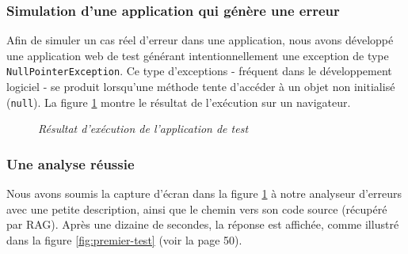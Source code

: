 \documentclass[12pt,a4paper]{report}
\begin{document}
	
	\subsubsection{Simulation d'une application qui génère une erreur}
	
	Afin de simuler un cas réel d'erreur dans une application, nous avons développé une application web de test générant intentionnellement une exception de type \verb|NullPointerException|. Ce type d'exceptions - fréquent dans le développement logiciel - se produit lorsqu'une méthode tente d'accéder à un objet non initialisé (\verb|null|). La figure \ref{fig:simulation-erreur} montre le résultat de l'exécution sur un navigateur.
	
	\begin{figure}[H]
		\centering
		\caption{\textit{Résultat d'exécution de l'application de test}}
		\label{fig:simulation-erreur}
	\end{figure}
	
	\subsubsection{Une analyse réussie}
	
	Nous avons soumis la capture d'écran dans la figure \ref{fig:simulation-erreur} à notre analyseur d'erreurs avec une petite description, ainsi que le chemin vers son code source (récupéré par RAG). Après une dizaine de secondes, la réponse est affichée, comme illustré dans la figure \ref{fig:premier-test} (voir la page 50).
	
\end{document}
